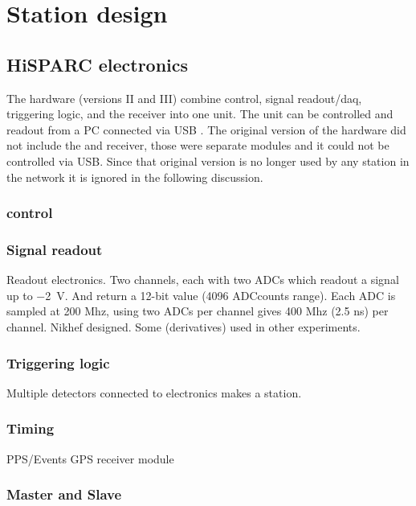 \section{Station design}

\subsection{HiSPARC electronics}

The \hisparc hardware (versions II and III) combine \pmt control, signal
readout/daq, triggering logic, and the \gps receiver into one unit. The
unit can be controlled and readout from a PC connected via USB
\cite{messages}. The original version of the \hisparc hardware did not
include the \daq and \gps receiver, those were separate modules and it
could not be controlled via USB. Since that original version is no
longer used by any station in the network it is ignored in the following
discussion.


\subsubsection{\pmt control}


\subsubsection{Signal readout}

Readout electronics. Two channels, each with two ADCs which readout a
signal up to \SI{-2}{\volt}. And return a 12-bit value (4096 ADCcounts
range). Each ADC is sampled at 200 Mhz, using two ADCs per channel gives
400 Mhz (2.5 ns) per channel. Nikhef designed. Some (derivatives) used
in other experiments.


\subsubsection{Triggering logic}

Multiple detectors connected to \hisparc electronics makes a station.


\subsubsection{Timing}

PPS/Events
GPS receiver module \cite{ref:trimble}


\subsubsection{Master and Slave}

